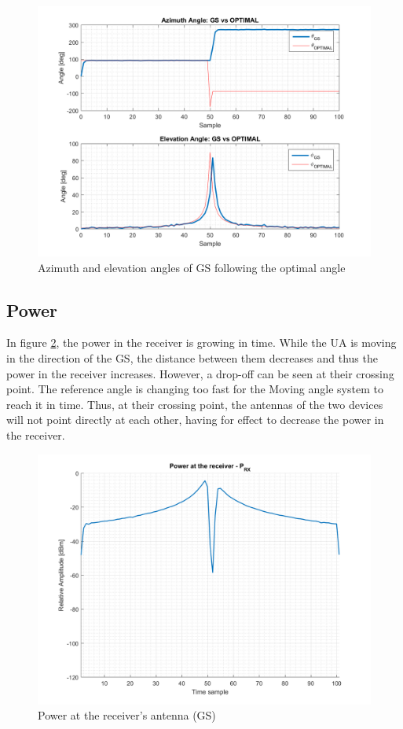 \begin{figure}[H]
	\centering
	\includegraphics[scale=0.75]{figures/s3_gs.png}
	\caption{Azimuth and elevation angles of GS following the optimal angle}
	\label{fig:s3_gs}
\end{figure}

\subsection{Power}
In figure \ref{fig:s3_power}, the power in the receiver is growing in time. While the UA is moving in the direction of the GS, the distance between them decreases and thus the power in the receiver increases. However, a drop-off can be seen at their crossing point. The reference angle is changing too fast for the Moving angle system to reach it in time. Thus, at their crossing point, the antennas of the two devices will not point directly at each other, having for effect to decrease the power in the receiver.

\begin{figure}[H]
	\centering
	\includegraphics[scale=0.75]{figures/s3_power.png}
	\caption{Power at the receiver's antenna (GS)}
	\label{fig:s3_power}
\end{figure}